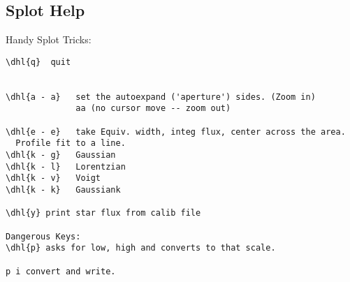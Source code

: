 \subsection{Splot Help}
Handy Splot Tricks:


\begingroup \fontsize{10pt}{10pt}
\selectfont
\begin{verbatim} 
\dhl{q}  quit


\dhl{a - a}   set the autoexpand ('aperture') sides. (Zoom in)
              aa (no cursor move -- zoom out)

\dhl{e - e}   take Equiv. width, integ flux, center across the area.
  Profile fit to a line.
\dhl{k - g}   Gaussian
\dhl{k - l}   Lorentzian
\dhl{k - v}   Voigt
\dhl{k - k}   Gaussiank

\dhl{y} print star flux from calib file

Dangerous Keys:
\dhl{p} asks for low, high and converts to that scale.

p i convert and write.


\end{verbatim}
\endgroup

